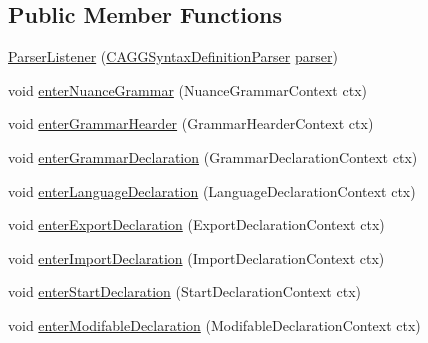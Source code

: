 \subsection*{Public Member Functions}
\begin{DoxyCompactItemize}
\item 
\hyperlink{classit_1_1emarolab_1_1cagg_1_1core_1_1language_1_1parser_1_1ParserListener_a25e8f1c6005bfb3cc6003a751a788f4c}{Parser\-Listener} (\hyperlink{classit_1_1emarolab_1_1cagg_1_1core_1_1language_1_1parser_1_1ANTLRInterface_1_1ANTLRGenerated_1_1CAGGSyntaxDefinitionParser}{C\-A\-G\-G\-Syntax\-Definition\-Parser} \hyperlink{classit_1_1emarolab_1_1cagg_1_1core_1_1language_1_1parser_1_1ANTLRInterface_1_1TreeParserListener_a81b2e5e2d506fb0384e95edadf4a844c}{parser})
\item 
void \hyperlink{classit_1_1emarolab_1_1cagg_1_1core_1_1language_1_1parser_1_1ParserListener_a152ac0c8c27b001c935f1ae6a1b809dc}{enter\-Nuance\-Grammar} (Nuance\-Grammar\-Context ctx)
\item 
void \hyperlink{classit_1_1emarolab_1_1cagg_1_1core_1_1language_1_1parser_1_1ParserListener_aff53855925af2c110af0903a9c77850f}{enter\-Grammar\-Hearder} (Grammar\-Hearder\-Context ctx)
\item 
void \hyperlink{classit_1_1emarolab_1_1cagg_1_1core_1_1language_1_1parser_1_1ParserListener_a77fa2c5d002d9cdd2a732e0c5500dc7f}{enter\-Grammar\-Declaration} (Grammar\-Declaration\-Context ctx)
\item 
void \hyperlink{classit_1_1emarolab_1_1cagg_1_1core_1_1language_1_1parser_1_1ParserListener_aca056086a7d76d5b75de1c589e160947}{enter\-Language\-Declaration} (Language\-Declaration\-Context ctx)
\item 
void \hyperlink{classit_1_1emarolab_1_1cagg_1_1core_1_1language_1_1parser_1_1ParserListener_a1315e7a4ad0f4c4e49f2f3480c529d08}{enter\-Export\-Declaration} (Export\-Declaration\-Context ctx)
\item 
void \hyperlink{classit_1_1emarolab_1_1cagg_1_1core_1_1language_1_1parser_1_1ParserListener_a98e63093f7b1fa17dd66b509049fe73a}{enter\-Import\-Declaration} (Import\-Declaration\-Context ctx)
\item 
void \hyperlink{classit_1_1emarolab_1_1cagg_1_1core_1_1language_1_1parser_1_1ParserListener_aed842d8c9b5c5053785a4909b2156eb9}{enter\-Start\-Declaration} (Start\-Declaration\-Context ctx)
\item 
void \hyperlink{classit_1_1emarolab_1_1cagg_1_1core_1_1language_1_1parser_1_1ParserListener_adf3d43ce72c8771b582d07621e6fe4c6}{enter\-Modifable\-Declaration} (Modifable\-Declaration\-Context ctx)

\end{DoxyCompactItemize}
